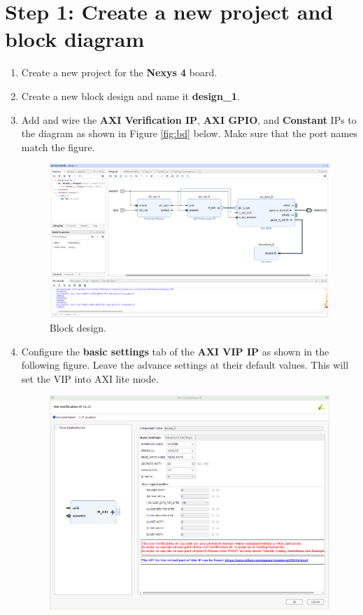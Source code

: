 \documentclass[12pt]{article}
\begin{document}
\section*{Step 1: Create a new project and block diagram}
\begin{enumerate}
	\item Create a new project for the \textbf{Nexys 4} board.
	\item Create a new block design and name it \textbf{design\_1}.
	\item Add and wire the \textbf{AXI Verification IP}, \textbf{AXI GPIO}, and \textbf{Constant} IPs to the diagram as shown in Figure \ref{fig:bd} below. Make sure that the port names match the figure.
		\begin{figure}[h]
		  \centering
		  \includegraphics[width=\textwidth]{nbd.png}
		  \caption{Block design.}
		  \label{fig:nbd}
		\end{figure}
	\item Configure the \textbf{basic settings} tab of the \textbf{AXI VIP IP} as shown in the following figure. Leave the advance settings at their default values. This will set the VIP into AXI lite mode. 
		\begin{figure}[H]
		  \centering
		  \includegraphics[width=\textwidth]{naxivipconfig.png}

\end{figure}
\end{enumerate}
\end{document}
